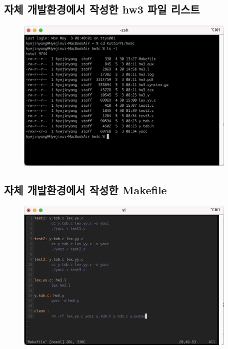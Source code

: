 \documentclass{article}
\begin{document}
\subsection{자체 개발환경에서 작성한 hw3 파일 리스트}
\begin{figure}[!htbp]
	\begin{center}
		\includegraphics[width=300pt]{hw3_file_list.png}
	\end{center}
\end{figure}

\subsection{자체 개발환경에서 작성한 Makefile}
\begin{figure}[!htbp]
	\begin{center}
		\includegraphics[width=300pt]{hw3_makefile.png}
	\end{center}
\end{figure}

\newpage
\end{document}
